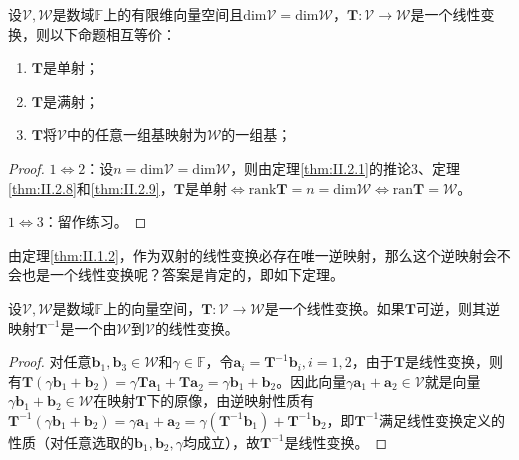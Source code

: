 \documentclass[main.tex]{subfiles}
\begin{document}
\begin{corollary}
    设$\mathcal{V},\mathcal{W}$是数域$\mathbb{F}$上的有限维向量空间且$\mathrm{dim}\mathcal{V}=\mathrm{dim}\mathcal{W}$，$\mathbf{T}:\mathcal{V}\rightarrow\mathcal{W}$是一个线性变换，则以下命题相互等价：
    \begin{enumerate}
        \item $\mathbf{T}$是单射；
        \item $\mathbf{T}$是满射；
        \item $\mathbf{T}$将$\mathcal{V}$中的任意一组基映射为$\mathcal{W}$的一组基；
    \end{enumerate}
\end{corollary}
\begin{proof}
    $1\Leftrightarrow 2$：设$n=\mathrm{dim}\mathcal{V}=\mathrm{dim}\mathcal{W}$，则由定理\ref{thm:II.2.1}的推论3、定理\ref{thm:II.2.8}和\ref{thm:II.2.9}，$\mathbf{T}$是单射$\Leftrightarrow\mathrm{rank}\mathbf{T}=n=\mathrm{dim}\mathcal{W}\Leftrightarrow\mathrm{ran}\mathbf{T}=\mathcal{W}$。

    $1\Leftrightarrow 3$：留作练习。
\end{proof}

由定理\ref{thm:II.1.2}，作为双射的线性变换必存在唯一逆映射，那么这个逆映射会不会也是一个线性变换呢？答案是肯定的，即如下定理。

\begin{theorem}\label{thm:II.2.10}
    设$\mathcal{V},\mathcal{W}$是数域$\mathbb{F}$上的向量空间，$\mathbf{T}:\mathcal{V}\rightarrow\mathcal{W}$是一个线性变换。如果$\mathbf{T}$可逆，则其逆映射$\mathbf{T}^{-1}$是一个由$\mathcal{W}$到$\mathcal{V}$的线性变换。
\end{theorem}
\begin{proof}
    对任意$\mathbf{b}_1,\mathbf{b}_3\in\mathcal{W}$和$\gamma\in\mathbb{F}$，令$\mathbf{a}_i=\mathbf{T}^{-1}\mathbf{b}_i,i=1,2$，由于$\mathbf{T}$是线性变换，则有$\mathbf{T}\left(\gamma\mathbf{b}_1+\mathbf{b}_2\right)=\gamma\mathbf{Ta}_1+\mathbf{Ta}_2=\gamma\mathbf{b}_1+\mathbf{b}_2$。因此向量$\gamma\mathbf{a}_1+\mathbf{a}_2\in\mathcal{V}$就是向量$\gamma\mathbf{b}_1+\mathbf{b}_2\in\mathcal{W}$在映射$\mathbf{T}$下的原像，由逆映射性质有$\mathbf{T}^{-1}\left(\gamma\mathbf{b}_1+\mathbf{b}_2\right)=\gamma\mathbf{a}_1+\mathbf{a}_2=\gamma\left(\mathbf{T}^{-1}\mathbf{b}_1\right)+\mathbf{T}^{-1}\mathbf{b}_2$，即$\mathbf{T}^{-1}$满足线性变换定义的性质（对任意选取的$\mathbf{b}_1,\mathbf{b}_2,\gamma$均成立），故$\mathbf{T}^{-1}$是线性变换。
\end{proof}
\end{document}
